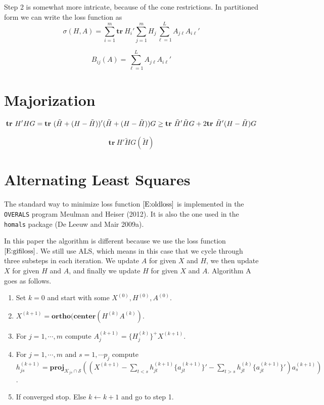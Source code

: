 \documentclass[
  12pt,
  letterpaper,
  DIV=11,
  numbers=noendperiod]{scrreprt}
\providecommand{\tightlist}{%
  \setlength{\itemsep}{0pt}\setlength{\parskip}{0pt}}
\begin{document}
Step 2 is somewhat more intricate, because of the cone restrictions. In
partitioned form we can write the loss function as \[
  \sigma(H,A)=\sum_{i=1}^m\mathbf{tr}\ H_i'\sum_{j=1}^mH_j\sum_{\ell=1}^LA_{j\ell}A_{i\ell}'
\]

\[
  B_{ij}(A)=\sum_{\ell=1}^LA_{j\ell}A_{i\ell}'
\]

\section{Majorization}\label{majorization}

\[
  \mathbf{tr}\ H'HG=\mathbf{tr}\ (\tilde H + (H - \tilde H))'(\tilde H + (H - \tilde H))G\geq\\\mathbf{tr}\ \tilde H'\tilde HG+2\mathbf{tr}\ \tilde H'(H - \tilde H)G
\]

\[
  \mathbf{tr}\ H'\tilde HG(\tilde H)
\]

\section{Alternating Least Squares}\label{alternating-least-squares}

The standard way to minimize loss function \(\eqref{E:oldloss}\) is
implemented in the \texttt{OVERALS} program Meulman and Heiser (2012).
It is also the one used in the \texttt{homals} package (De Leeuw and
Mair 2009a).

In this paper the algorithm is different because we use the loss
function \(\eqref{E:gifiloss}\). We still use ALS, which means in this
case that we cycle through three substeps in each iteration. We update
\(A\) for given \(X\) and \(H\), we then update \(X\) for given \(H\)
and \(A\), and finally we update \(H\) for given \(X\) and \(A\).
Algorithm A goes as follows.

\begin{enumerate}
\def\labelenumi{\arabic{enumi}.}
\setcounter{enumi}{-1}
\tightlist
\item
  Set \(k=0\) and start with some \(X^{(0)},H^{(0)},A^{(0)}\).
\item
  \(X^{(k+1)}=\mathbf{ortho}(\mathbf{center}(H^{(k)}A^{(k)})\).
\item
  For \(j=1,\cdots,m\) compute \(A_j^{(k+1)}=\{H_j^{(k)}\}^+X^{(k+1)}\).
\item
  For \(j=1,\cdots,m\) and \(s=1,\cdots p_j\) compute
  \(h_{js}^{(k+1)}=\mathbf{proj}_{\mathcal{K}_{js}\cap\mathcal{S}}((X^{(k+1)}-\sum_{t<s}h_{jt}^{(k+1)}\{a_{jt}^{(k+1)}\}'-\sum_{t>s}h_{jt}^{(k)}\{a_{jt}^{(k+1)}\}')a_s^{(k+1)})\).
\item
  If converged stop. Else \(k\leftarrow k+1\) and go to step 1.
\end{enumerate}
\end{document}
